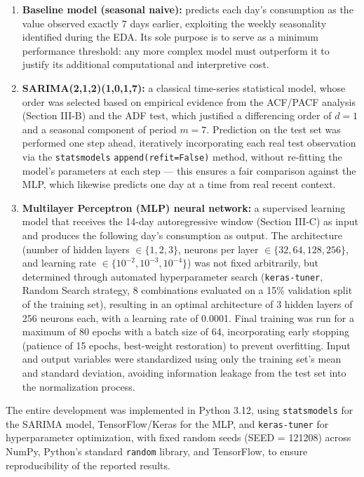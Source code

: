 \documentclass{ieeeaccess}
\begin{document}
\begin{enumerate}
\item \textbf{Baseline model (seasonal naive):} predicts each day's consumption as the value observed exactly 7 days earlier, exploiting the weekly seasonality identified during the EDA. Its sole purpose is to serve as a minimum performance threshold: any more complex model must outperform it to justify its additional computational and interpretive cost.
\item \textbf{SARIMA(2,1,2)(1,0,1,7):} a classical time-series statistical model, whose order was selected based on empirical evidence from the ACF/PACF analysis (Section III-B) and the ADF test, which justified a differencing order of $d=1$ and a seasonal component of period $m=7$. Prediction on the test set was performed one step ahead, iteratively incorporating each real test observation via the \texttt{statsmodels} \texttt{append(refit=False)} method, without re-fitting the model's parameters at each step --- this ensures a fair comparison against the MLP, which likewise predicts one day at a time from real recent context.
\item \textbf{Multilayer Perceptron (MLP) neural network:} a supervised learning model that receives the 14-day autoregressive window (Section III-C) as input and produces the following day's consumption as output. The architecture (number of hidden layers $\in \{1,2,3\}$, neurons per layer $\in \{32,64,128,256\}$, and learning rate $\in \{10^{-2},10^{-3},10^{-4}\}$) was not fixed arbitrarily, but determined through automated hyperparameter search (\texttt{keras-tuner}, Random Search strategy, 8 combinations evaluated on a 15\% validation split of the training set), resulting in an optimal architecture of 3 hidden layers of 256 neurons each, with a learning rate of 0.0001. Final training was run for a maximum of 80 epochs with a batch size of 64, incorporating early stopping (patience of 15 epochs, best-weight restoration) to prevent overfitting. Input and output variables were standardized using only the training set's mean and standard deviation, avoiding information leakage from the test set into the normalization process.
\end{enumerate}

The entire development was implemented in Python 3.12, using \texttt{statsmodels} for the SARIMA model, TensorFlow/Keras for the MLP, and \texttt{keras-tuner} for hyperparameter optimization, with fixed random seeds (SEED = 121208) across NumPy, Python's standard \texttt{random} library, and TensorFlow, to ensure reproducibility of the reported results.
\end{document}
